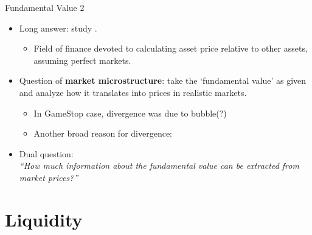 \documentclass[english,10pt
,aspectratio=169
]{beamer}
\begin{document}
\begin{frame}{Fundamental Value 2}
	\begin{itemize}
		\item Long answer: study .
		\begin{itemize}
			\item Field of finance devoted to calculating asset price relative to other assets, assuming perfect markets.
		\end{itemize}
		
		\bigskip
		\pause
		
		\item Question of \textbf{market microstructure}: take the `\alert{fundamental value}' as given and analyze how it \alert{translates into prices} in realistic markets.
		\pause
		\begin{itemize}
			\item In GameStop case, divergence was due to bubble(?)
			\item Another broad reason for divergence: 
		\end{itemize}
		
		\pause[2]
		\item Dual question:  \\
		\emph{``How much information about the fundamental value can be extracted from market prices?''}
	\end{itemize}
\end{frame}



\section{Liquidity}
\end{document}
